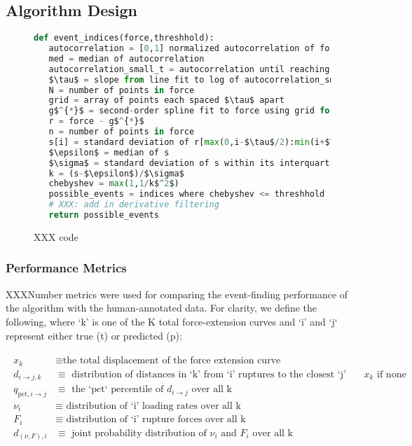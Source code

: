 \documentclass[%
  aip,12pt,tightenlines,
  amsthm,
 amsmath,amssymb
]{article}
\newcommand{\eqs}[1]{
\begin{align*} 
\begin{split}
#1
\end{split}					
\end{align*}}
\newcommand{\fLabel}[1]{\label{figure:#1}}
\newcommand{\sLabel}[1]{\label{section:#1}}
\newcommand{\pcaption}[1]{\caption{\noindent#1}}
\newcommand{\pEndF}[0]{ \\ }
\newcommand{\pStartF}[0]{ }
\begin{document}
\subsection{\sLabel{Algorithm}Algorithm Design}


\begin{figure}
  \begin{lstlisting}[language=Python]
def event_indices(force,threshhold):
   autocorrelation = [0,1] normalized autocorrelation of force
   med = median of autocorrelation
   autocorrelation_small_t = autocorrelation until reaching med
   $\tau$ = slope from line fit to log of autocorrelation_small_t
   N = number of points in force
   grid = array of points each spaced $\tau$ apart
   g$^{*}$ = second-order spline fit to force using grid for knots
   r = force - g$^{*}$
   n = number of points in force
   s[i] = standard deviation of r[max(0,i-$\tau$/2):min(i+$\tau$/2,n)]
   $\epsilon$ = median of s
   $\sigma$ = standard deviation of s within its interquartile region
   k = (s-$\epsilon$)/$\sigma$
   chebyshev = max(1,1/k$^2$)
   possible_events = indices where chebyshev <= threshhold
   # XXX: add in derivative filtering
   return possible_events
\end{lstlisting}
\pcaption{\noindent\fLabel{Code}\pStartF XXX code  \pEndF }
\end{figure}

\subsubsection{\sLabel{Metrics}Performance Metrics}

XXXNumber metrics were used for comparing the event-finding performance of the algorithm with the human-annotated data. For clarity, we define the following, where `k' is one of the K total force-extension curves and `i' and `j` represent either true (t) or predicted (p):

\eqs{ 
x_k &\equiv \text{the total displacement of the force extension curve} \\
d_{i\rightarrow j,k} &\equiv \text{ distribution of distances in `k' from `i' ruptures to the closest `j' ruptures in or $x_k$ if none } \\
q_{\text{pct},i\rightarrow j} &\equiv \text{ the `pct` percentile of } d_{i\rightarrow j} \text{ over all k } \\
\nu_i &\equiv \text{ distribution of `i' loading rates over all k} \\
F_i &\equiv \text{ distribution of `i' rupture forces over all k} \\
d_{(\nu,F),i} &\equiv \text{ joint probability distribution of $\nu_i$ and $F_i$ over all k} \\
 }
\end{document}
